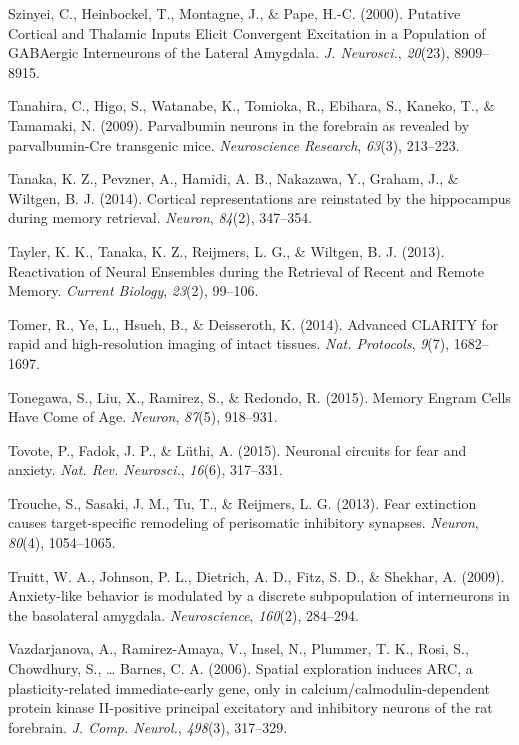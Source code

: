 \documentclass[12pt,a4paperpaper,]{report}
\begin{document}
\hypertarget{ref-szinyeiux5fputativeux5f2000}{}
Szinyei, C., Heinbockel, T., Montagne, J., \& Pape, H.-C. (2000).
Putative Cortical and Thalamic Inputs Elicit Convergent Excitation in a
Population of GABAergic Interneurons of the Lateral Amygdala. \emph{J.
Neurosci.}, \emph{20}(23), 8909--8915.

\hypertarget{ref-tanahiraux5fparvalbuminux5f2009}{}
Tanahira, C., Higo, S., Watanabe, K., Tomioka, R., Ebihara, S., Kaneko,
T., \& Tamamaki, N. (2009). Parvalbumin neurons in the forebrain as
revealed by parvalbumin-Cre transgenic mice. \emph{Neuroscience
Research}, \emph{63}(3), 213--223.

\hypertarget{ref-tanakaux5fcorticalux5f2014}{}
Tanaka, K. Z., Pevzner, A., Hamidi, A. B., Nakazawa, Y., Graham, J., \&
Wiltgen, B. J. (2014). Cortical representations are reinstated by the
hippocampus during memory retrieval. \emph{Neuron}, \emph{84}(2),
347--354.

\hypertarget{ref-taylerux5freactivationux5f2013}{}
Tayler, K. K., Tanaka, K. Z., Reijmers, L. G., \& Wiltgen, B. J. (2013).
Reactivation of Neural Ensembles during the Retrieval of Recent and
Remote Memory. \emph{Current Biology}, \emph{23}(2), 99--106.

\hypertarget{ref-tomerux5fadvancedux5f2014}{}
Tomer, R., Ye, L., Hsueh, B., \& Deisseroth, K. (2014). Advanced CLARITY
for rapid and high-resolution imaging of intact tissues. \emph{Nat.
Protocols}, \emph{9}(7), 1682--1697.

\hypertarget{ref-tonegawaux5fmemoryux5f2015}{}
Tonegawa, S., Liu, X., Ramirez, S., \& Redondo, R. (2015). Memory Engram
Cells Have Come of Age. \emph{Neuron}, \emph{87}(5), 918--931.

\hypertarget{ref-tovoteux5fneuronalux5f2015}{}
Tovote, P., Fadok, J. P., \& Lüthi, A. (2015). Neuronal circuits for
fear and anxiety. \emph{Nat. Rev. Neurosci.}, \emph{16}(6), 317--331.

\hypertarget{ref-troucheux5ffearux5f2013}{}
Trouche, S., Sasaki, J. M., Tu, T., \& Reijmers, L. G. (2013). Fear
extinction causes target-specific remodeling of perisomatic inhibitory
synapses. \emph{Neuron}, \emph{80}(4), 1054--1065.

\hypertarget{ref-truittux5fanxiety-likeux5f2009}{}
Truitt, W. A., Johnson, P. L., Dietrich, A. D., Fitz, S. D., \& Shekhar,
A. (2009). Anxiety-like behavior is modulated by a discrete
subpopulation of interneurons in the basolateral amygdala.
\emph{Neuroscience}, \emph{160}(2), 284--294.

\hypertarget{ref-vazdarjanovaux5fspatialux5f2006}{}
Vazdarjanova, A., Ramirez-Amaya, V., Insel, N., Plummer, T. K., Rosi,
S., Chowdhury, S., \ldots{} Barnes, C. A. (2006). Spatial exploration
induces ARC, a plasticity-related immediate-early gene, only in
calcium/calmodulin-dependent protein kinase II-positive principal
excitatory and inhibitory neurons of the rat forebrain. \emph{J. Comp.
Neurol.}, \emph{498}(3), 317--329.
\end{document}
